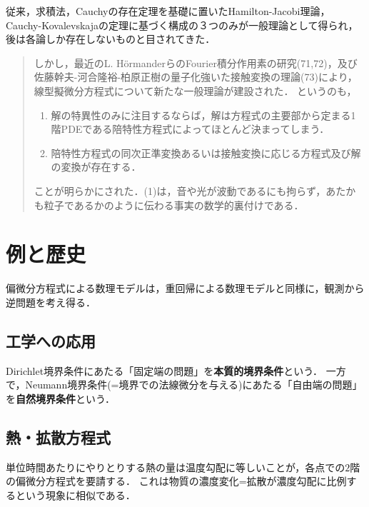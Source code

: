 \documentclass[uplatex,dvipdfmx]{jsreport}
\begin{document}
従来，求積法，Cauchyの存在定理を基礎に置いたHamilton-Jacobi理論，Cauchy-Kovalevskajaの定理に基づく構成の３つのみが一般理論として得られ，後は各論しか存在しないものと目されてきた．
\begin{quotation}
    しかし，最近のL. HörmanderらのFourier積分作用素の研究(71,72)，及び佐藤幹夫-河合隆裕-柏原正樹の量子化強いた接触変換の理論(73)により，線型擬微分方程式について新たな一般理論が建設された．
    というのも，
    \begin{enumerate}
        \item 解の特異性のみに注目するならば，解は方程式の主要部から定まる1階PDEである陪特性方程式によってほとんど決まってしまう．
        \item 陪特性方程式の同次正準変換あるいは接触変換に応じる方程式及び解の変換が存在する．
    \end{enumerate}
    ことが明らかにされた．(1)は，音や光が波動であるにも拘らず，あたかも粒子であるかのように伝わる事実の数学的裏付けである．
\end{quotation}

\section{例と歴史}

\begin{remarks}[偏微分方程式の逆問題]
    偏微分方程式による数理モデルは，重回帰による数理モデルと同様に，観測から逆問題を考え得る．
\end{remarks}

\subsection{工学への応用}

\begin{definition}
    Dirichlet境界条件にあたる「固定端の問題」を\textbf{本質的境界条件}という．
    一方で，Neumann境界条件(=境界での法線微分を与える)にあたる「自由端の問題」を\textbf{自然境界条件}という．
\end{definition}

\subsection{熱・拡散方程式}

\begin{tcolorbox}[colframe=ForestGreen, colback=ForestGreen!10!white,breakable,colbacktitle=ForestGreen!40!white,coltitle=black,fonttitle=\bfseries\sffamily,
title=]
    単位時間あたりにやりとりする熱の量は温度勾配に等しいことが，各点での$2$階の偏微分方程式を要請する．
    これは物質の濃度変化=拡散が濃度勾配に比例するという現象に相似である．
\end{tcolorbox}
\end{document}
